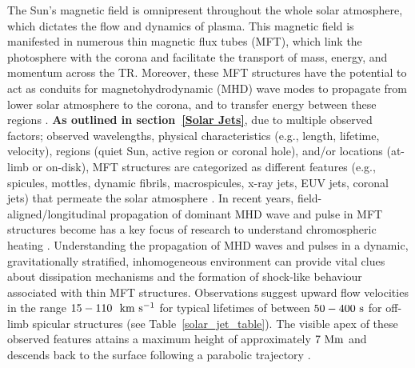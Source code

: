 The Sun's magnetic field is omnipresent throughout the whole solar atmosphere, which dictates the flow and dynamics of plasma. This magnetic field is manifested in numerous thin magnetic flux tubes (MFT), which link the photosphere with the corona and facilitate the transport of mass, energy, and momentum across the TR. Moreover, these MFT structures have the potential to act as conduits for magnetohydrodynamic (MHD) wave modes to propagate from lower solar atmosphere to the corona, and to transfer energy between these regions \citep{Pontieu2004Natur, Kukhianidze2006AA449L35K, Zaqarashvili2007AA474627Z, He2009AA497525H}. {\bf As outlined in section~\ref{Solar Jets}}, due to multiple observed factors; observed wavelengths, physical characteristics (e.g., length, lifetime, velocity), regions (quiet Sun, active region or coronal hole), and/or locations (at-limb or on-disk), MFT structures are categorized as different features (e.g., spicules, mottles, dynamic fibrils, macrospicules, x-ray jets, EUV jets, coronal jets) that permeate the solar atmosphere \citep[see reviews by:][]{Beckers1968, Beckers1972ARA&A, Tsiropoula2012}.  In recent years, field-aligned/longitudinal propagation of dominant MHD wave and pulse in MFT structures become has a key focus of research to understand chromospheric heating \citep{Narain1990, Zaqarashvili_2009SSRv, Jess2015}. Understanding the propagation of MHD waves and pulses in a dynamic, gravitationally stratified, inhomogeneous environment can provide vital clues about dissipation mechanisms and the formation of shock-like behaviour associated with thin MFT structures. Observations suggest upward flow velocities in the range $15-110 ~~\rm{km ~s^{-1}}$ for typical lifetimes of between $50-400~\rm{s}$ for off-limb spicular structures (see Table~\ref{solar_jet_table}). The visible apex of these observed features attains a maximum height of approximately $7~\rm{Mm}$ and descends back to the surface following a parabolic trajectory \citep{Pereira2012,Pereira2016ApJ82465P}. \np
%
